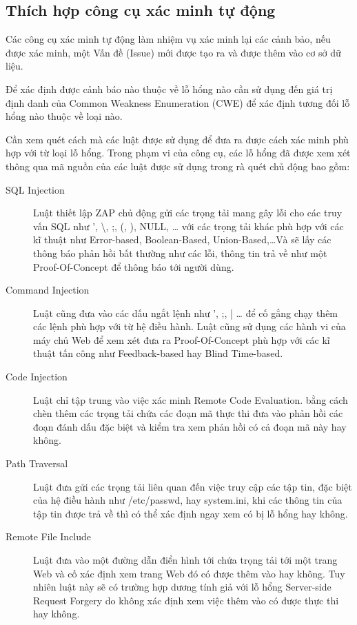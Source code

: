 \documentclass[./../main.tex]{subfiles}
\begin{document}
\subsection{Thích hợp công cụ xác minh tự động}

Các công cụ xác minh tự động làm nhiệm vụ xác minh lại các cảnh bảo,
nếu được xác minh, một Vấn đề (Issue) mới được tạo ra và được thêm vào cơ sở dữ
liệu.

Để xác định được cảnh báo nào thuộc về lỗ hổng nào cần sử dụng đến
giá trị định danh của Common Weakness Enumeration (CWE) để xác định
tương đối lỗ hổng nào thuộc về loại nào.

Cần xem quét cách mà các luật được sử dụng để đưa ra được cách xác minh phù
hợp với từ loại lỗ hổng. Trong phạm vi của công cụ, các lỗ hổng đã được
xem xét thông qua mã nguồn của các luật được sử dụng trong rà quét chủ động
bao gồm:
\begin{description}
	\item[SQL Injection] Luật thiết lập ZAP chủ động gửi các trọng tải mang
	      gây lỗi cho các truy vấn SQL như ', \textbackslash, ;, (, ), NULL, \ldots
	      với các trọng tải khác phù hợp với các kĩ thuật như Error-based, Boolean-Based,
	      Union-Based,\ldots Và sẽ lấy các thông báo phản hồi bất thường như
	      các lỗi, thông tin trả về như một Proof-Of-Concept để thông báo tới
	      người dùng.
	\item[Command Injection] Luật cũng đưa vào các dấu ngắt lệnh như ', ;, | \ldots
	      để cố gắng chạy thêm các lệnh phù hợp với từ hệ điều hành. Luật cũng
	      sử dụng các hành vi của máy chủ Web để xem xét đưa ra Proof-Of-Concept
	      phù hợp với các kĩ thuật tấn công như Feedback-based hay Blind Time-based.
	\item[Code Injection] Luật chỉ tập trung vào việc xác minh Remote Code Evaluation.
	      bằng cách chèn thêm các trọng tải chứa các đoạn mã thực thi đưa
	      vào phản hồi các đoạn đánh dấu đặc biệt và kiểm tra xem phản hồi
	      có cả đoạn mã này hay không.
	\item[Path Traversal] Luật đưa gửi các trọng tải liên quan đến việc truy
	      cập các tập tin, đặc biệt của hệ điều hành như /etc/passwd, hay system.ini,
	      khi các thông tin của tập tin được trả về thì có thể xác định ngay xem
	      có bị lỗ hổng hay không.
	\item[Remote File Include] Luật đưa vào một đường dẫn điển hình tới
	      chứa trọng tải tới một trang Web và cố xác định xem trang Web đó có được
	      thêm vào hay không. Tuy nhiên luật này sẽ có trường hợp dương tính giả
	      với lỗ hổng Server-side Request Forgery do không xác định xem việc
	      thêm vào có được thực thi hay không.

\end{description}
\end{document}

